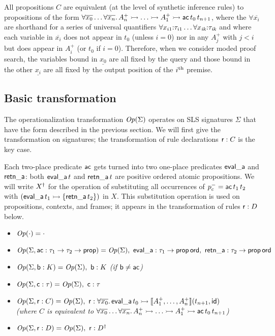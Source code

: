 All propositions $C$ are equivalent (at the level of synthetic
inference rules) to propositions of the form $\forall
\overline{x_0}\ldots \forall \overline{x_n}.\,A^+_n \rightarrowtail \ldots
\rightarrowtail A^+_1 \rightarrowtail {\sf ac}\,t_{0}\,t_{n+1}$, where the $\forall
\overline{x_i}$ are shorthand for a series of universal quantifiers
$\forall {x_{i1}}{:}{\tau_{i1}} \ldots \forall {x_{\it
    ik}}{:}{\tau_{\it ik}}$ and where each variable in
$\overline{x_i}$ does not appear in $t_0$ (unless $i = 0$) nor in any
$A^+_j$ with $j < i$ but does appear in $A^+_i$ (or $t_0$ if $i =
0$). Therefore, when we consider moded proof search, the variables
bound in $\underline{x_0}$ are all fixed by the query and those bound
in the other $\underline{x_i}$ are all fixed by the output position of
the $i^{\rm th}$ premise.

\subsection{Basic transformation}
\label{sec:trans-basic}

The operationalization transformation ${\it Op}({\Sigma})$
operates on SLS signatures $\Sigma$ that have the form described in the
previous section. We
will first give the transformation on signatures; the transformation
of rule declarations ${\sf r} : C$ is the key case.

Each two-place predicate ${\sf ac}$ gets turned into two one-place
predicates ${\sf eval\_a}$ and ${\sf retn\_a}$: both ${\sf
  eval\_a}\,t$ and ${\sf retn\_a}\,t$ are positive ordered atomic
propositions.  We will write ${{X}^\dag}$ for the operation of
substituting all occurrences of $p^-_c = {\sf ac}\,t_1\,t_2$ with
$({\sf eval\_a}\,t_1 \rightarrowtail \{ {\sf retn\_a}\,t_2 \})$ in $X$. This
substitution operation is used on propositions, contexts, and frames;
it appears in the transformation of rules ${\sf r} : D$ below.

\begin{itemize}
\item ${\it Op}({\cdot}) = \cdot$
\item ${\it Op}({\Sigma, {\sf ac} : \tau_1 \rightarrow \tau_2
    \rightarrow {\sf prop}}) = {\it Op}({\Sigma}), ~ {\sf eval\_a} :
  \tau_1 \rightarrow {\sf prop\,ord}, ~ {\sf retn\_a} : \tau_2
  \rightarrow {\sf prop\,ord}$ 
\item ${\it Op}({\Sigma, {\sf b} : K}) = {\it Op}({\Sigma}), ~ {\sf b}
  : K$ {\it (if ${\sf b} \neq {\sf ac}$)}
\item ${\it Op}({\Sigma, {\sf c} : \tau}) = {\it Op}({\Sigma}), ~ {\sf
    c} : \tau$ 
\item ${\it Op}({\Sigma, {\sf r} : C}) = {\it Op}({\Sigma}), ~ {\sf r}
  : \forall \overline{x_0}.\, {\sf eval\_a}\,t_0 \rightarrowtail \llbracket A^+_1,
  \ldots, A^+_n \rrbracket (t_{n+1}, {\sf id})$ \\ {\it (where $C$ is
    equivalent to $\forall \overline{x_0}\ldots \forall
    \overline{x_n}.\, A^+_n \rightarrowtail \ldots \rightarrowtail A^+_1 \rightarrowtail {\sf
      ac}\,t_{0}\,t_{n+1}$)}
\item ${\it Op}({\Sigma, {\sf r} : D}) = {\it Op}({\Sigma}), ~ {\sf r}
  : {{D}^\dag}$
\end{itemize}

